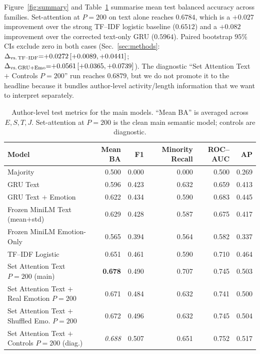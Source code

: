\documentclass{article}
\begin{document}
Figure~\ref{fig:summary} and Table~\ref{tab:main} summarise mean test balanced accuracy across families. Set-attention at $P{=}200$ on text alone reaches $0.6784$, which is a $+0.027$ improvement over the strong TF--IDF logistic baseline ($0.6512$) and a $+0.082$ improvement over the corrected text-only GRU ($0.5964$). Paired bootstrap $95\%$ CIs exclude zero in both cases (Sec.~\ref{sec:methods}: $\Delta_{\text{vs.\,TF--IDF}}{=}{+}0.0272\,[+0.0089,+0.0441]$; $\Delta_{\text{vs.\,GRU+Emo}}{=}{+}0.0561\,[+0.0365,+0.0739]$). The diagnostic ``Set Attention Text $+$ Controls $P{=}200$'' run reaches $0.6879$, but we do not promote it to the headline because it bundles author-level activity/length information that we want to interpret separately.

\begin{table}[t]
\small
\centering
\caption{Author-level test metrics for the main models. ``Mean BA'' is averaged across $E,S,T,J$. Set-attention at $P{=}200$ is the clean main semantic model; controls are diagnostic.}
\label{tab:main}
\begin{tabular}{lrrrrr}
\toprule
Model & Mean BA & F1 & Minority Recall & ROC--AUC & AP \\
\midrule
Majority                                       & 0.500 & 0.000 & 0.000 & 0.500 & 0.269 \\
GRU Text                                       & 0.596 & 0.423 & 0.632 & 0.659 & 0.413 \\
GRU Text $+$ Emotion                           & 0.622 & 0.434 & 0.590 & 0.683 & 0.445 \\
Frozen MiniLM Text (mean$+$std)                & 0.629 & 0.428 & 0.587 & 0.675 & 0.417 \\
Frozen MiniLM Emotion-Only                     & 0.565 & 0.394 & 0.564 & 0.582 & 0.337 \\
TF--IDF Logistic                               & 0.651 & 0.461 & 0.590 & 0.710 & 0.464 \\
Set Attention Text $P{=}200$ (main)            & \textbf{0.678} & 0.490 & 0.707 & 0.745 & 0.503 \\
Set Attention Text $+$ Real Emotion $P{=}200$  & 0.671 & 0.484 & 0.632 & 0.741 & 0.500 \\
Set Attention Text $+$ Shuffled Emo. $P{=}200$ & 0.672 & 0.496 & 0.632 & 0.745 & 0.504 \\
Set Attention Text $+$ Controls $P{=}200$ (diag.) & \emph{0.688} & 0.507 & 0.651 & 0.752 & 0.517 \\
\bottomrule
\end{tabular}
\end{table}
\end{document}
